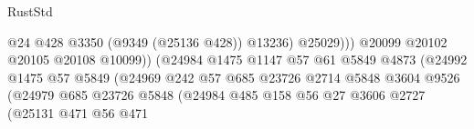 \begin{lexlean}{RustStd}
\begin{coremodule}
                                                        @24
                                                        @428
                                                        @3350
                                                        (@9349 (@25136 @428))
                                                        @13236)
                                                      @25029)))
                                                @20099
                                                @20102
                                                @20105
                                                @20108
                                                @10099))
                                            (@24984
                                              @1475
                                              @1147
                                              @57
                                              @61
                                              @5849
                                              @4873
                                              (@24992
                                                @1475
                                                @57
                                                @5849
                                                (@24969
                                                  @242
                                                  @57
                                                  @685
                                                  @23726
                                                  @2714
                                                  @5848
                                                  @3604
                                                  @9526
                                                  (@24979
                                                    @685
                                                    @23726
                                                    @5848
                                                    (@24984
                                                      @485
                                                      @158
                                                      @56
                                                      @27
                                                      @3606
                                                      @2727
                                                      (@25131
                                                        @471
                                                        @56
                                                        @471

\end{coremodule}
\end{lexlean}
